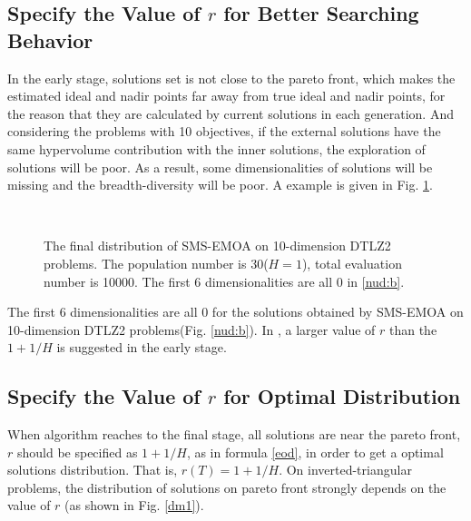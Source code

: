 \documentclass[conference]{IEEEtran}
\begin{document}
\subsection{Specify the Value of $r$ for Better Searching Behavior}
In the early stage, solutions set is not close to the pareto front, which makes the 
estimated ideal and nadir points far away from true ideal and nadir points, for the reason that
they are calculated by current solutions in each generation. 
And considering the problems with 10 objectives, 
if the external solutions have the same hypervolume contribution with the inner solutions, 
the exploration of solutions will be poor. 
As a result, some dimensionalities of solutions will be missing and the breadth-diversity\cite{DtA} will be poor. 
A example is given in Fig. \ref{nud}. 
\begin{figure}[!t]
  \centering
  \quad
  \\
  \caption{
    The final distribution of SMS-EMOA on 10-dimension DTLZ2 problems. 
    The population number is 30($H=1$), total evaluation number is 10000.
    The first 6 dimensionalities are all 0 in \ref{nud:b}. 
  }
  \label{nud}
\end{figure} 
The first 6 dimensionalities are all 0 for the solutions obtained by SMS-EMOA on 10-dimension DTLZ2 problems(Fig. \ref{nud:b}). 
In \cite{hisao:dynamic}, a larger value of $r$ than the $1+1/H$ is suggested in the early stage. 

\subsection{Specify the Value of $r$ for Optimal Distribution}
When algorithm reaches to the final stage, all solutions are near the pareto front, $r$ should
be specified as $1+1/H$, as in formula \ref{eod}, 
in order to get a optimal solutions distribution. 
That is, $r(T)=1+1/H$. 
On inverted-triangular problems, the distribution of solutions on pareto front
strongly depends on the value of $r$ (as shown in Fig. \ref{dm1}). 
\end{document}
